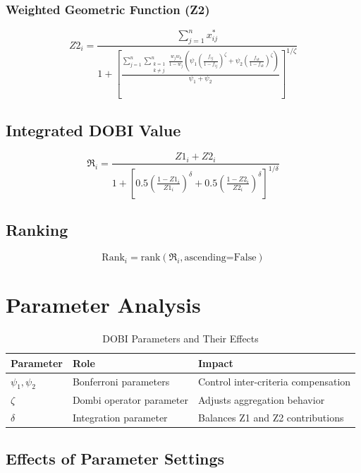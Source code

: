 \documentclass{article}
\begin{document}
\subsubsection{Weighted Geometric Function (Z2)}
\begin{equation}
Z2_i = \frac{\sum_{j=1}^n x_{ij}^*}{1 + \left[\frac{\sum_{j=1}^n \sum_{\substack{k=1 \\ k \neq j}}^n \frac{w_j w_k}{1-w_j} \left(\psi_1 \left(\frac{f_{ij}}{1-f_{ij}}\right)^\zeta + \psi_2 \left(\frac{f_{ik}}{1-f_{ik}}\right)^\zeta\right)}{\psi_1 + \psi_2}\right]^{1/\zeta}}
\end{equation}

\subsection{Integrated DOBI Value}
\begin{equation}
\Re_i = \frac{Z1_i + Z2_i}{1 + \left[0.5\left(\frac{1-Z1_i}{Z1_i}\right)^\delta + 0.5\left(\frac{1-Z2_i}{Z2_i}\right)^\delta\right]^{1/\delta}}
\end{equation}

\subsection{Ranking}
\begin{equation}
\text{Rank}_i = \text{rank}(\Re_i, \text{ascending=False})
\end{equation}

\section{Parameter Analysis}

\begin{table}[h]
\centering
\caption{DOBI Parameters and Their Effects}
\begin{tabular}{lll}
\toprule
Parameter & Role & Impact \\
\midrule
$\psi_1,\psi_2$ & Bonferroni parameters & Control inter-criteria compensation \\
$\zeta$ & Dombi operator parameter & Adjusts aggregation behavior \\
$\delta$ & Integration parameter & Balances Z1 and Z2 contributions \\
\bottomrule
\end{tabular}
\end{table}

\subsection{Effects of Parameter Settings}
\end{document}
